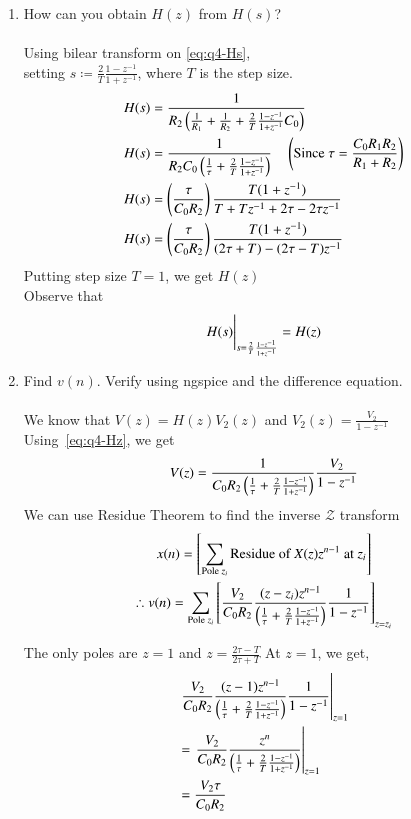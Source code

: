\documentclass[journal,12pt,twocolumn]{IEEEtran}
\renewcommand\thesection{\arabic{section}}
\begin{document}
\begin{enumerate}[label=\arabic*.,ref=\thesection.\theenumi]
\item How can you obtain $H(z)$ from $H(s)$? \\
	\solution \\
	Using bilear transform on \eqref{eq:q4-Hs}, \\
	setting \( \displaystyle s \coloneqq \frac{2}{T} \frac{1-z^{-1}}{1+z^{-1}} \), 
	where \( T \) is the step size.
	\begin{align*}
		H(s) &= \frac{1}{R_2 \left(\frac{1}{R_1} + \frac{1}{R_2} + 
			\frac{2}{T} \frac{1-z^{-1}}{1+z^{-1}} C_0 \right)} \\
		H(s) &= \frac{1}{R_2C_0 \left(\frac{1}{\tau} + 
			\frac{2}{T} \frac{1-z^{-1}}{1+z^{-1}}\right)} \quad 
			\left(\text{Since } \tau = \dfrac{C_0R_1R_2}{R_1+R_2}\right) \\
		H(s) &= \left(\frac{\tau}{C_0R_2}\right) \frac{T(1 + z^{-1})}{T+Tz^{-1} + 2\tau -2\tau z^{-1}} \\
		H(s) &= \left(\frac{\tau}{C_0R_2}\right) \frac{T(1 + z^{-1})}{(2\tau+T) - (2\tau-T)z^{-1}}
	\end{align*}
	Putting step size \( T = 1 \), we get \( H(z) \) \\

	Observe that
	\[ \displaystyle H(s) \Bigg{|}_{s=\frac{2}{T} \frac{1-z^{-1}}{1+z^{-1}}} = H(z) \]


\item Find \( v(n) \).
Verify using ngspice and the difference equation. \\
\solution \\
	We know that \( V(z) = H(z) V_2(z) \) and \( V_2(z) = \frac{V_2}{1 - z^{-1}} \) \\
	Using~\eqref{eq:q4-Hz}, we get
	\[
		V(z) = \frac{1}{C_0 R_2\left(\frac{1}{\tau} +
		\frac{2}{T} \frac{1-z^{-1}}{1+z^{-1}}\right)} \frac{V_2}{1 - z^{-1}}
	\]
	We can use Residue Theorem to find the inverse \( \mathcal{Z} \) transform
	\begin{gather*}
		x(n) = \left[ \sum_{\text{Pole } z_i} \text{Residue of } X(z)z^{n-1} \text{ at } z_i \right]\\
	    \therefore v(n) = \sum_{\text{Pole } z_i} \left[ \frac{V_2}{C_0 R_2} \frac{(z-z_i)z^{n-1}}{\left(\frac{1}{\tau} +
		\frac{2}{T} \frac{1-z^{-1}}{1+z^{-1}}\right)} \frac{1}{1 - z^{-1}} \right]_{z=z_i}
	\end{gather*}

	The only poles are \( z = 1 \) and \( z = \frac{2\tau - T}{2\tau + T} \)
	At \( z = 1 \), we get,
	\begin{align*}
		& \left. \frac{V_2}{C_0 R_2} \frac{(z-1)z^{n-1}}{\left(\frac{1}{\tau} +
		\frac{2}{T} \frac{1-z^{-1}}{1+z^{-1}}\right)} \frac{1}{1 - z^{-1}} \right|_{z=1} \\
		&= \left. \frac{V_2}{C_0 R_2} \frac{z^n}{\left(\frac{1}{\tau} +
		\frac{2}{T} \frac{1-z^{-1}}{1+z^{-1}}\right)} \right|_{z=1} \\
		&= \frac{V_2\tau}{C_0 R_2}
	\end{align*}


\end{enumerate}
\end{document}
